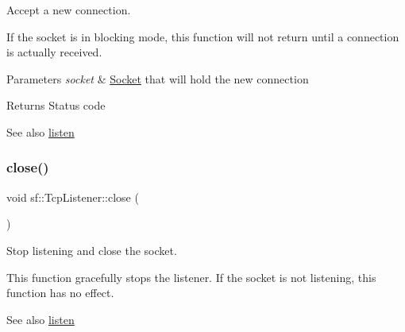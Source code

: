 Accept a new connection. 

If the socket is in blocking mode, this function will not return until a connection is actually received.


\begin{DoxyParams}{Parameters}
{\em socket} & \mbox{\hyperlink{classsf_1_1_socket}{Socket}} that will hold the new connection\\
\hline
\end{DoxyParams}
\begin{DoxyReturn}{Returns}
Status code
\end{DoxyReturn}
\begin{DoxySeeAlso}{See also}
\mbox{\hyperlink{classsf_1_1_tcp_listener_a9504758ea3570e62cb20b209c11776a1}{listen}} \begin{DoxyVerb}\end{DoxyVerb}
 
\end{DoxySeeAlso}
\mbox{\label{classsf_1_1_tcp_listener_a3a00a850506bd0f9f48867a0fe59556b}} 
\subsubsection{\texorpdfstring{close()}{close()}}
{\footnotesize\ttfamily void sf\+::\+Tcp\+Listener\+::close (\begin{DoxyParamCaption}{ }\end{DoxyParamCaption})}



Stop listening and close the socket. 

This function gracefully stops the listener. If the socket is not listening, this function has no effect.

\begin{DoxySeeAlso}{See also}
\mbox{\hyperlink{classsf_1_1_tcp_listener_a9504758ea3570e62cb20b209c11776a1}{listen}} \begin{DoxyVerb}\end{DoxyVerb}
 
\end{DoxySeeAlso}
\mbox{\label{classsf_1_1_tcp_listener_a784b9a9c59d4cdbae1795e90b8015780}} 
